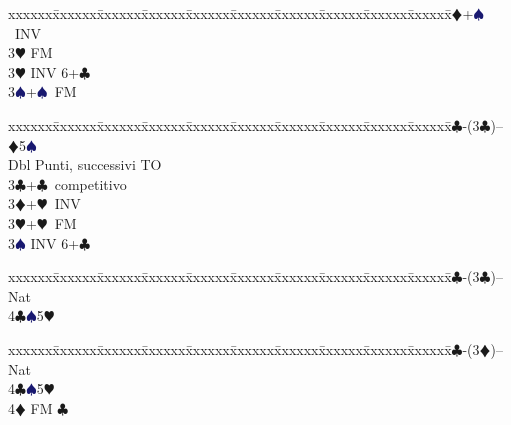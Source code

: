 \documentclass[a4paper,italian]{article}
\newcommand{\BC}{\textcolor{OliveGreen}{$\clubsuit$}}
\newcommand{\BD}{\textcolor{RedOrange}{$\vardiamondsuit$}}
\newcommand{\BH}{\textcolor{Red2}{$\varheartsuit${}}}
\newcommand{\BS}{\textcolor{MidnightBlue}{$\spadesuit${}}}
\newenvironment{bidtable}
{\begin{tabbing}

    xxxxxx\=xxxxxx\=xxxxxx\=xxxxxx\=xxxxxx\=xxxxxx\=xxxxxx\=xxxxxx\=xxxxxx\=xxxxxx\=\kill}
{\end{tabbing} }%
\begin{document}
\begin{multicols}{2}
\begin{bidtable}
        3\BD {}+\BS\ INV\+\\
        3\BH \> FM\-\\
        3\BH \> INV 6+\BC \\
        3\BS {}+\BS\ FM\-
    \end{bidtable}
    \begin{bidtable}
        1\BC-(3\BC)-- \> \BD 5\BS \+\\
        Dbl \> Punti, successivi TO\\
        3\BC {}+\BC\ competitivo\\
        3\BD {}+\BH\ INV\\
        3\BH {}+\BH\ FM\\
        3\BS \> INV 6+\BC \-
    \end{bidtable}
    \begin{bidtable}
        1\BC-(3\BC)-- \> \> Nat\+\\
        4\BC {}\BS 5\BH \-
    \end{bidtable}
    \begin{bidtable}
        1\BC-(3\BD)-- \> \> Nat\+\\
        4\BC {}\BS 5\BH \\
        4\BD \> FM \BC \-
    \end{bidtable}


\end{multicols}
\end{document}
